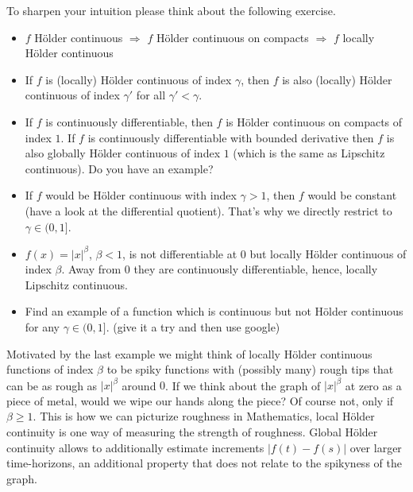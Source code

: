 	To sharpen your intuition please think about the following exercise.
\begin{luebung}
	\begin{itemize}
		\item $f$ H\"older continuous $\Rightarrow$ $f$ H\"older continuous on compacts $\Rightarrow$ $f$ locally H\"older continuous
		\item If $f$ is (locally) H\"older continuous of index $\gamma$, then $f$ is also (locally) H\"older continuous of index $\gamma'$ for all $\gamma'<\gamma$.
		\item If $f$ is continuously differentiable, then $f$ is H\"older continuous on compacts of index $1$. If $f$ is continuously differentiable with bounded derivative then $f$ is also globally H\"older continuous of index $1$ (which is the same as Lipschitz continuous). Do you have an example?
		\item If $f$ would be H\"older continuous with index $\gamma>1$, then $f$ would be constant (have a look at the differential quotient). That's why we directly restrict to $\gamma\in (0,1]$.
		\item $f(x)=|x|^\beta$, $\beta<1$, is not differentiable at $0$ but locally H\"older continuous of index $\beta$. Away from $0$ they are continuously differentiable, hence, locally Lipschitz continuous.
  	\item Find an example of a function which is continuous but not H\"older continuous for any $\gamma\in (0,1]$. (give it a try and then use google)
	\end{itemize}
\end{luebung}
Motivated by the last example we might think of locally H\"older continuous functions of index $\beta$ to be spiky functions with (possibly many) rough tips that can be as rough as $|x|^\beta$ around $0$. If we think about the graph of $|x|^\beta$ at zero as a piece of metal, would we wipe our hands along the piece? Of course not, only if $\beta \geq 1$. This is how we can picturize roughness in Mathematics, local H\"older continuity is one way of measuring the strength of roughness. Global H\"older continuity allows to additionally estimate increments $|f(t)-f(s)|$ over larger time-horizons, an additional property that does not relate to the spikyness of the graph.
\smallskip

